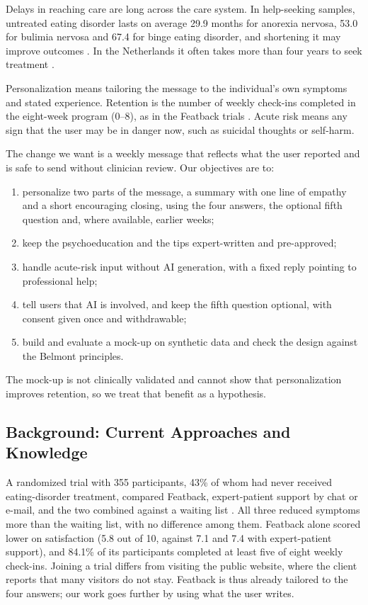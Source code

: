 \documentclass[a4paper]{article}
\begin{document}
Delays in reaching care are long across the care system. In help-seeking samples, untreated eating disorder lasts on average 29.9 months for anorexia nervosa, 53.0 for bulimia nervosa and 67.4 for binge eating disorder, and shortening it may improve outcomes \citep{austin2021duration}. In the Netherlands it often takes more than four years to seek treatment \citep{rohrbach2019protocol}.

Personalization means tailoring the message to the individual's own symptoms and stated experience. Retention is the number of weekly check-ins completed in the eight-week program (0--8), as in the Featback trials \citep{rohrbach2019protocol}. Acute risk means any sign that the user may be in danger now, such as suicidal thoughts or self-harm.

The change we want is a weekly message that reflects what the user reported and is safe to send without clinician review. Our objectives are to:
\begin{enumerate}
  \item personalize two parts of the message, a summary with one line of empathy and a short encouraging closing, using the four answers, the optional fifth question and, where available, earlier weeks;
  \item keep the psychoeducation and the tips expert-written and pre-approved;
  \item handle acute-risk input without AI generation, with a fixed reply pointing to professional help;
  \item tell users that AI is involved, and keep the fifth question optional, with consent given once and withdrawable;
  \item build and evaluate a mock-up on synthetic data and check the design against the Belmont principles.
\end{enumerate}
The mock-up is not clinically validated and cannot show that personalization improves retention, so we treat that benefit as a hypothesis.

\subsection{Background: Current Approaches and Knowledge} 

A randomized trial with 355 participants, 43\% of whom had never received eating-disorder treatment, compared Featback, expert-patient support by chat or e-mail, and the two combined against a waiting list \citep{rohrbach2022featback}. All three reduced symptoms more than the waiting list, with no difference among them. Featback alone scored lower on satisfaction (5.8 out of 10, against 7.1 and 7.4 with expert-patient support), and 84.1\% of its participants completed at least five of eight weekly check-ins. Joining a trial differs from visiting the public website, where the client reports that many visitors do not stay. Featback is thus already tailored to the four answers; our work goes further by using what the user writes.
\end{document}
